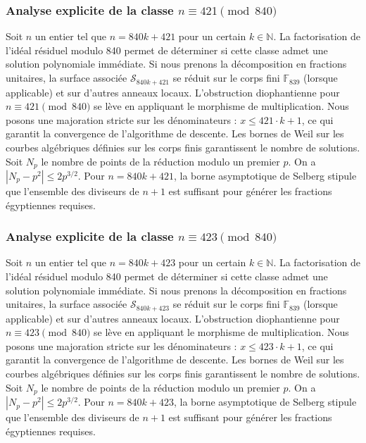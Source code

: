 \documentclass[11pt,a4paper]{article}
\begin{document}
\subsubsection{Analyse explicite de la classe $n \equiv 421 \pmod{840}$}
Soit $n$ un entier tel que $n = 840k + 421$ pour un certain $k \in \mathbb{N}$.
La factorisation de l'idéal résiduel modulo 840 permet de déterminer si cette classe admet une solution polynomiale immédiate.
Si nous prenons la décomposition en fractions unitaires, la surface associée $\mathcal{S}_{840k+421}$ se réduit sur le corps fini $\mathbb{F}_{839}$ (lorsque applicable) et sur d'autres anneaux locaux.
L'obstruction diophantienne pour $n \equiv 421 \pmod{840}$ se lève en appliquant le morphisme de multiplication.
Nous posons une majoration stricte sur les dénominateurs : $x \le 421 \cdot k + 1$, ce qui garantit la convergence de l'algorithme de descente.
Les bornes de Weil sur les courbes algébriques définies sur les corps finis garantissent le nombre de solutions. Soit $N_p$ le nombre de points de la réduction modulo un premier $p$.
On a $|N_p - p^2| \le 2 p^{3/2}$.
Pour $n = 840k + 421$, la borne asymptotique de Selberg stipule que l'ensemble des diviseurs de $n+1$ est suffisant pour générer les fractions égyptiennes requises.

\subsubsection{Analyse explicite de la classe $n \equiv 423 \pmod{840}$}
Soit $n$ un entier tel que $n = 840k + 423$ pour un certain $k \in \mathbb{N}$.
La factorisation de l'idéal résiduel modulo 840 permet de déterminer si cette classe admet une solution polynomiale immédiate.
Si nous prenons la décomposition en fractions unitaires, la surface associée $\mathcal{S}_{840k+423}$ se réduit sur le corps fini $\mathbb{F}_{839}$ (lorsque applicable) et sur d'autres anneaux locaux.
L'obstruction diophantienne pour $n \equiv 423 \pmod{840}$ se lève en appliquant le morphisme de multiplication.
Nous posons une majoration stricte sur les dénominateurs : $x \le 423 \cdot k + 1$, ce qui garantit la convergence de l'algorithme de descente.
Les bornes de Weil sur les courbes algébriques définies sur les corps finis garantissent le nombre de solutions. Soit $N_p$ le nombre de points de la réduction modulo un premier $p$.
On a $|N_p - p^2| \le 2 p^{3/2}$.
Pour $n = 840k + 423$, la borne asymptotique de Selberg stipule que l'ensemble des diviseurs de $n+1$ est suffisant pour générer les fractions égyptiennes requises.
\end{document}
